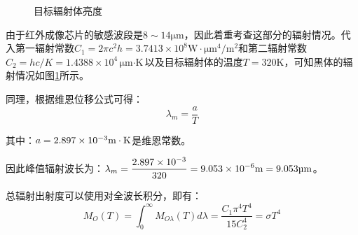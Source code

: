 \documentclass[11pt]{article}
\begin{document}
\begin{figure}[H]
  \centering
  \centering
  \caption{目标辐射体亮度}
  \label{fig:普朗克公式}
\end{figure}
由于红外成像芯片的敏感波段是$8\sim14\unit{\um}$，因此着重考查这部分的辐射情况。代入第一辐射常数$C_1=2\pi c^2h=3.7413\times 10^8\unit{\W\cdot \um^4/\m^2}$和第二辐射常数$C_2=hc/K=1.4388\times 10^4\unit{\um\cdot \K}$以及目标辐射体的温度$T=320\unit{\K}$，可知黑体的辐射情况如图\ref{fig:普朗克公式}所示。\par
同理，根据维恩位移公式可得：
\begin{equation}
  \lambda_m=\frac{a}{T}
  \label{forem:维恩位移公式}
\end{equation}

其中：$a=\rm 2.897\times 10^{-3}m\cdot K$是维恩常数。\par
因此峰值辐射波长为：$\displaystyle\lambda_m=\rm \frac{2.897\times 10^{-3}}{320}=9.053\times 10^{-6}\unit{\m}=9.053\unit{\um}$。\par
总辐射出射度可以使用对全波长积分，即有：
\begin{equation}
  M_O(T)=\int_0^\infty M_{O\lambda}(T)d\lambda=\frac{C_1\pi
    ^4T^4}{15C_2^4}=\sigma T^4
  \label{forem:总辐出度公式}
\end{equation}
\end{document}
